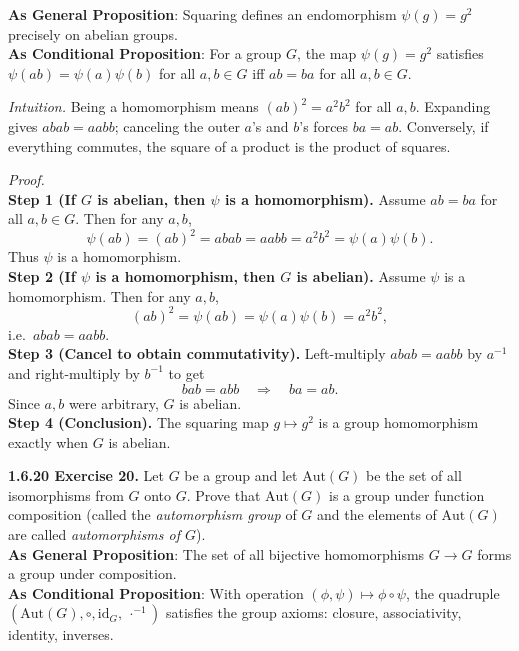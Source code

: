 \documentclass[12pt]{article}
\theoremstyle{definition}
\begin{document}
\noindent\textbf{As General Proposition}: Squaring defines an endomorphism $\psi(g)=g^2$ precisely on abelian groups.\\

\noindent \textbf{As Conditional Proposition}: For a group $G$, the map $\psi(g)=g^2$ satisfies $\psi(ab)=\psi(a)\psi(b)$ for all $a,b\in G$ iff $ab=ba$ for all $a,b\in G$.

\newpage

\dotfill

\emph{Intuition.} Being a homomorphism means $(ab)^2=a^2b^2$ for all $a,b$. Expanding gives $abab=aabb$; canceling the outer $a$’s and $b$’s forces $ba=ab$. Conversely, if everything commutes, the square of a product is the product of squares.\\

\dotfill

\emph{Proof.}\\
\textbf{Step 1 (If $G$ is abelian, then $\psi$ is a homomorphism).} Assume $ab=ba$ for all $a,b\in G$. Then for any $a,b$,
\[
\psi(ab)=(ab)^2=abab=aabb=a^2b^2=\psi(a)\psi(b).
\]
Thus $\psi$ is a homomorphism.\\
\textbf{Step 2 (If $\psi$ is a homomorphism, then $G$ is abelian).} Assume $\psi$ is a homomorphism. Then for any $a,b$,
\[
(ab)^2=\psi(ab)=\psi(a)\psi(b)=a^2b^2,
\]
i.e.\ $abab=aabb$.\\
\textbf{Step 3 (Cancel to obtain commutativity).} Left-multiply $abab=aabb$ by $a^{-1}$ and right-multiply by $b^{-1}$ to get
\[
bab=abb \quad\Rightarrow\quad ba=ab.
\]
Since $a,b$ were arbitrary, $G$ is abelian.\\
\textbf{Step 4 (Conclusion).} The squaring map $g\mapsto g^2$ is a group homomorphism exactly when $G$ is abelian.

\newpage

\noindent \textbf{1.6.20 Exercise 20.} Let $G$ be a group and let $\mathrm{Aut}(G)$ be the set of all isomorphisms from $G$ onto $G$. Prove that $\mathrm{Aut}(G)$ is a group under function composition (called the \emph{automorphism group} of $G$ and the elements of $\mathrm{Aut}(G)$ are called \emph{automorphisms of $G$}).\\ %

\noindent\textbf{As General Proposition}: The set of all bijective homomorphisms $G\to G$ forms a group under composition.\\

\noindent \textbf{As Conditional Proposition}: With operation $(\phi,\psi)\mapsto \phi\circ\psi$, the quadruple $(\mathrm{Aut}(G),\circ,\mathrm{id}_G,~\cdot^{-1})$ satisfies the group axioms: closure, associativity, identity, inverses.\\
\end{document}
